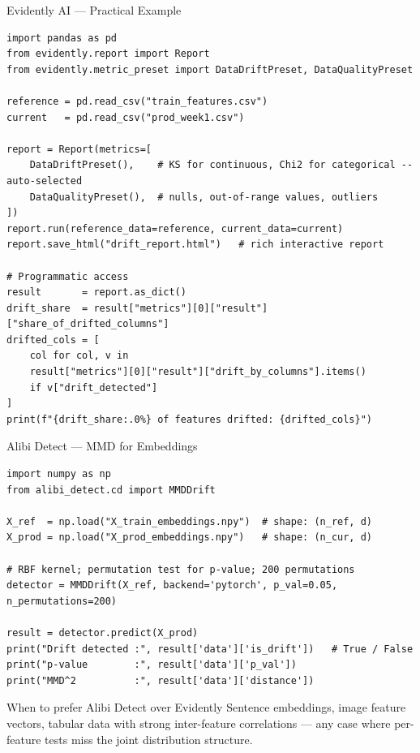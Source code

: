 \documentclass[10pt,aspectratio=169]{beamer}
\begin{document}
\begin{frame}[fragile]{Evidently AI --- Practical Example}
  \begin{lstlisting}[style=pycode]
import pandas as pd
from evidently.report import Report
from evidently.metric_preset import DataDriftPreset, DataQualityPreset

reference = pd.read_csv("train_features.csv")
current   = pd.read_csv("prod_week1.csv")

report = Report(metrics=[
    DataDriftPreset(),    # KS for continuous, Chi2 for categorical -- auto-selected
    DataQualityPreset(),  # nulls, out-of-range values, outliers
])
report.run(reference_data=reference, current_data=current)
report.save_html("drift_report.html")   # rich interactive report

# Programmatic access
result       = report.as_dict()
drift_share  = result["metrics"][0]["result"]["share_of_drifted_columns"]
drifted_cols = [
    col for col, v in
    result["metrics"][0]["result"]["drift_by_columns"].items()
    if v["drift_detected"]
]
print(f"{drift_share:.0%} of features drifted: {drifted_cols}")
  \end{lstlisting}
\end{frame}

\begin{frame}[fragile]{Alibi Detect --- MMD for Embeddings}
  \begin{lstlisting}[style=pycode]
import numpy as np
from alibi_detect.cd import MMDDrift

X_ref  = np.load("X_train_embeddings.npy")  # shape: (n_ref, d)
X_prod = np.load("X_prod_embeddings.npy")   # shape: (n_cur, d)

# RBF kernel; permutation test for p-value; 200 permutations
detector = MMDDrift(X_ref, backend='pytorch', p_val=0.05, n_permutations=200)

result = detector.predict(X_prod)
print("Drift detected :", result['data']['is_drift'])   # True / False
print("p-value        :", result['data']['p_val'])
print("MMD^2          :", result['data']['distance'])
  \end{lstlisting}
  \vspace{0.1cm}
  \begin{block}{When to prefer Alibi Detect over Evidently}
    Sentence embeddings, image feature vectors, tabular data with strong inter-feature correlations --- any case where per-feature tests miss the joint distribution structure.
  \end{block}
\end{frame}
\end{document}
